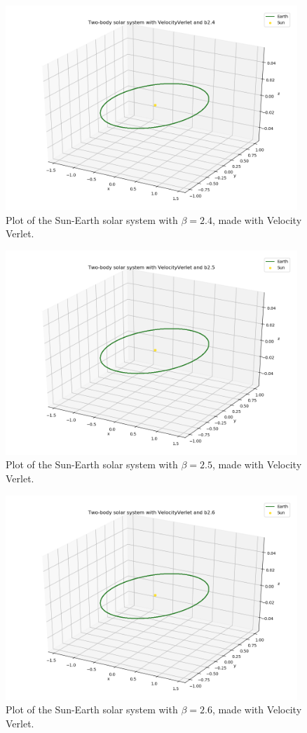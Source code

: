 \documentclass{article}
\begin{document}
    \begin{figure}[H]
        \centering
        \includegraphics[width = 11cm]{img/plot3D_S_E_V_b24.png}
        \caption{Plot of the Sun-Earth solar system with $\beta = 2.4$, made with Velocity Verlet.}
        \label{fig:plot3D_S_E_V_b24}
    \end{figure}

    \begin{figure}[H]
        \centering
        \includegraphics[width = 11cm]{img/plot3D_S_E_V_b25.png}
        \caption{Plot of the Sun-Earth solar system with $\beta = 2.5$, made with Velocity Verlet.}
        \label{fig:plot3D_S_E_V_b25}
    \end{figure}

    \begin{figure}[H]
        \centering
        \includegraphics[width = 11cm]{img/plot3D_S_E_V_b26.png}
        \caption{Plot of the Sun-Earth solar system with $\beta = 2.6$, made with Velocity Verlet.}
        \label{fig:plot3D_S_E_V_b26}
    \end{figure}
\end{document}
